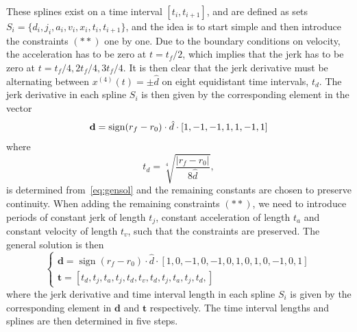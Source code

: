 \documentclass{article}
\DeclareMathOperator{\sign}{sign}
\begin{document}
These splines exist on a time interval $[t_i,t_{i+1}]$, and are defined as sets $S_i = \{d_i, j_i, a_i, v_i, x_i,t_i, t_{i+1}\}$, and the idea is to start simple and then introduce the constraints $(**)$ one by one. Due to the boundary conditions on velocity, the acceleration has to be zero at $t=t_f/2$, which implies that the jerk has to be zero at  $t = t_f/4,2t_f/4,3t_f/4$. It is then clear that the jerk derivative must be alternating between $x^{(4)}(t)=\pm\hat{d}$ on eight equidistant time intervals, $t_d$. 
The jerk derivative in each spline $S_i$ is then given by the corresponding element in the vector
\begin{equation}\label{eq:djerksol}
\mathbf{d} = \sign(r_f - r_0)\cdot\hat{d}\cdot[1,-1,-1,1,1,-1,1]\\
\end{equation}
where 
\begin{equation}\label{eq:djerkref}
t_d=\sqrt[4]{\dfrac{|r_f - r_0|}{8\hat{d}}},
\end{equation}
is determined from~\eqref{eq:gensol} and the remaining constants are chosen to preserve continuity. When adding the remaining constraints $(**)$, we need to introduce periods of constant jerk of length $t_j$, constant acceleration of length $t_a$ and constant velocity of length $t_v$, such that the constraints are preserved. The general solution is then 
\begin{equation}
\begin{cases}\label{eq:fullsol}
\mathbf{d} = \sign(r_f - r_0)\cdot\hat{d}\cdot[1,0,-1,0,-1,0,1,0,1,0,-1,0,1]\\
\mathbf{t} =[t_d,t_j,t_a,t_j,t_d,t_v,t_d,t_j,t_a,t_j,t_d,]
\end{cases}
\end{equation}
where the jerk derivative and time interval length in each spline $S_i$ is given by the corresponding element in $\mathbf{d}$ and $\mathbf{t}$ respectively. The time interval lengths and splines are then determined in five steps.
\end{document}
